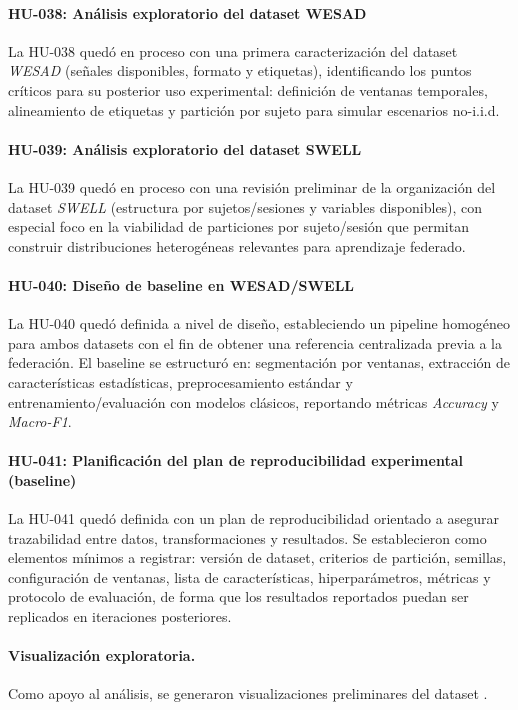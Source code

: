 \documentclass{report}
\begin{document}
\paragraph{HU-038: Análisis exploratorio del dataset WESAD}
La HU-038 quedó en proceso con una primera caracterización del dataset \textit{WESAD} (señales disponibles, formato y etiquetas), identificando los puntos críticos para su posterior uso experimental: definición de ventanas temporales, alineamiento de etiquetas y partición por sujeto para simular escenarios no-i.i.d.

\paragraph{HU-039: Análisis exploratorio del dataset SWELL}
La HU-039 quedó en proceso con una revisión preliminar de la organización del dataset \textit{SWELL} (estructura por sujetos/sesiones y variables disponibles), con especial foco en la viabilidad de particiones por sujeto/sesión que permitan construir distribuciones heterogéneas relevantes para aprendizaje federado.

\paragraph{HU-040: Diseño de baseline en WESAD/SWELL}
La HU-040 quedó definida a nivel de diseño, estableciendo un pipeline homogéneo para ambos datasets con el fin de obtener una referencia centralizada previa a la federación. El baseline se estructuró en: segmentación por ventanas, extracción de características estadísticas, preprocesamiento estándar y entrenamiento/evaluación con modelos clásicos, reportando métricas \textit{Accuracy} y \textit{Macro-F1}.

\paragraph{HU-041: Planificación del plan de reproducibilidad experimental (baseline)}
La HU-041 quedó definida con un plan de reproducibilidad orientado a asegurar trazabilidad entre datos, transformaciones y resultados. Se establecieron como elementos mínimos a registrar: versión de dataset, criterios de partición, semillas, configuración de ventanas, lista de características, hiperparámetros, métricas y protocolo de evaluación, de forma que los resultados reportados puedan ser replicados en iteraciones posteriores.




\paragraph{Visualización exploratoria.}
Como apoyo al análisis, se generaron visualizaciones preliminares del dataset .
\end{document}
